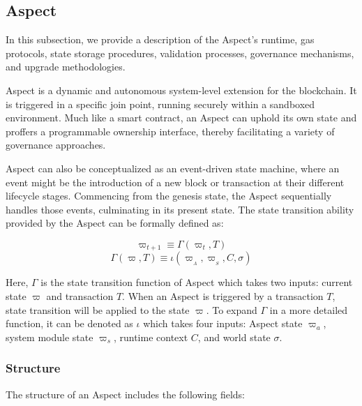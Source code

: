 \subsection{Aspect}

In this subsection, we provide a description of the Aspect's runtime, gas protocols, state storage procedures, validation processes, governance mechanisms, and upgrade methodologies.

Aspect is a dynamic and autonomous system-level extension for the blockchain. It is triggered in a specific join point, running securely within a sandboxed environment. Much like a smart contract, an Aspect can uphold its own state and proffers a programmable ownership interface, thereby facilitating a variety of governance approaches.

Aspect can also be conceptualized as an event-driven state machine, where an event might be the introduction of a new block or transaction at their different lifecycle stages. Commencing from the genesis state, the Aspect sequentially handles those events, culminating in its present state. The state transition ability provided by the Aspect can be formally defined as:

\[
\varpi_{t+1} \equiv \Gamma(\varpi_t,T)
\]
\[
\Gamma(\varpi,T) \equiv \iota(\varpi_{_{A}},\varpi_{_{S}},C,\sigma)
\]

Here, $\Gamma$ is the state transition function of Aspect which takes two inputs: current state $\varpi$ and transaction $T$. When an Aspect is triggered by a transaction $T$, state transition will be applied to the state $\varpi$. To expand $\Gamma$ in a more detailed function, it can be denoted as $\iota$ which takes four inputs: Aspect state $\varpi_a$, system module state $\varpi_s$, runtime context $C$, and world state $\sigma$.

\subsubsection{Structure}

The structure of an Aspect includes the following fields:

